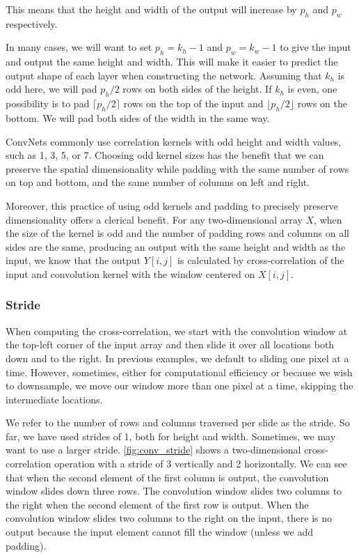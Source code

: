 This means that the height and width of the output will increase by  $p_h$  and  $p_w$  respectively.

In many cases, we will want to set  $p_h=k_h-1$  and  $p_w=k_w-1$  to give the input and output the same height and width. This will make it easier to predict the output shape of each layer when constructing the network. Assuming that  $k_h$  is odd here, we will pad  $p_h/2$ rows on both sides of the height. If $k_h$  is even, one possibility is to pad  $\lceil p_h/2\rceil$  rows on the top of the input and  $\lfloor p_h/2\rfloor$  rows on the bottom. We will pad both sides of the width in the same way.

ConvNets commonly use correlation kernels with odd height and width values, such as 1, 3, 5, or 7. Choosing odd kernel sizes has the benefit that we can preserve the spatial dimensionality while padding with the same number of rows on top and bottom, and the same number of columns on left and right.

Moreover, this practice of using odd kernels and padding to precisely preserve dimensionality offers a clerical benefit. For any two-dimensional array $X$, when the size of the kernel is odd and the number of padding rows and columns on all sides are the same, producing an output with the same height and width as the input, we know that the output $Y[i,j]$ is calculated by cross-correlation of the input and convolution kernel with the window centered on $X[i,j]$.

\subsubsection{Stride}

When computing the cross-correlation, we start with the convolution window at the top-left corner of the input array and then slide it over all locations both down and to the right. In previous examples, we default to sliding one pixel at a time. However, sometimes, either for computational efficiency or because we wish to downsample, we move our window more than one pixel at a time, skipping the intermediate locations.

We refer to the number of rows and columns traversed per slide as the stride. So far, we have used strides of 1, both for height and width. Sometimes, we may want to use a larger stride. \cref{fig:conv_stride} shows a two-dimensional cross-correlation operation with a stride of 3 vertically and 2 horizontally. We can see that when the second element of the first column is output, the convolution window slides down three rows. The convolution window slides two columns to the right when the second element of the first row is output. When the convolution window slides two columns to the right on the input, there is no output because the input element cannot fill the window (unless we add padding).

